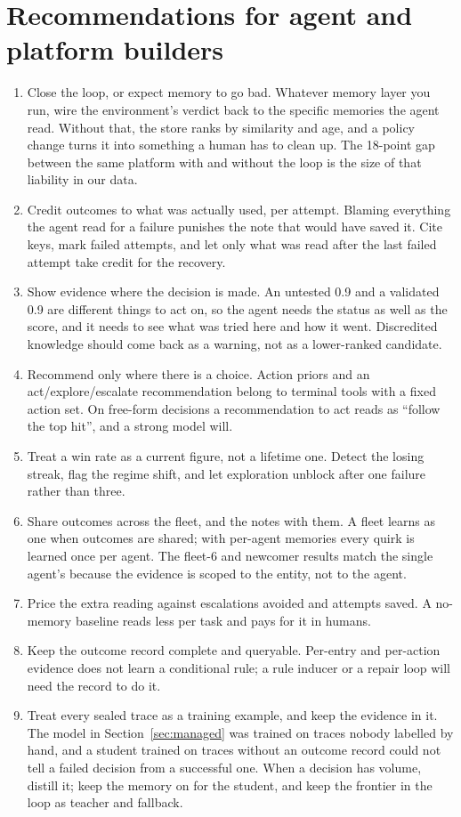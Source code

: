 \documentclass[11pt]{article}
\begin{document}
\section{Recommendations for agent and platform builders}
\label{sec:recs}

\begin{enumerate}[leftmargin=1.6em, itemsep=3pt]
\item Close the loop, or expect memory to go bad. Whatever memory layer you run, wire the
  environment's verdict back to the specific memories the agent read. Without that, the store
  ranks by similarity and age, and a policy change turns it into something a human has to
  clean up. The 18-point gap between the same platform with and without the loop is the size of
  that liability in our data.
\item Credit outcomes to what was actually used, per attempt. Blaming everything the agent read
  for a failure punishes the note that would have saved it. Cite keys, mark failed attempts,
  and let only what was read after the last failed attempt take credit for the recovery.
\item Show evidence where the decision is made. An untested 0.9 and a validated 0.9 are
  different things to act on, so the agent needs the status as well as the score, and it needs
  to see what was tried here and how it went. Discredited knowledge should come back as a
  warning, not as a lower-ranked candidate.
\item Recommend only where there is a choice. Action priors and an act/explore/escalate
  recommendation belong to terminal tools with a fixed action set. On free-form decisions a
  recommendation to act reads as ``follow the top hit'', and a strong model will.
\item Treat a win rate as a current figure, not a lifetime one. Detect the losing streak, flag
  the regime shift, and let exploration unblock after one failure rather than three.
\item Share outcomes across the fleet, and the notes with them. A fleet learns as one when
  outcomes are shared; with per-agent memories every quirk is learned once per agent. The fleet-6 and newcomer results match
  the single agent's because the evidence is scoped to the entity, not to the agent.
\item Price the extra reading against escalations avoided and attempts saved. A no-memory
  baseline reads less per task and pays for it in humans.
\item Keep the outcome record complete and queryable. Per-entry and per-action evidence does
  not learn a conditional rule; a rule inducer or a repair loop will need the record to do it.
\item Treat every sealed trace as a training example, and keep the evidence in it. The model
  in Section~\ref{sec:managed} was trained on traces nobody labelled by hand, and a student
  trained on traces without an outcome record could not tell a failed decision from a
  successful one. When a decision has volume, distill it; keep the memory on for the student,
  and keep the frontier in the loop as teacher and fallback.
\end{enumerate}
\end{document}
